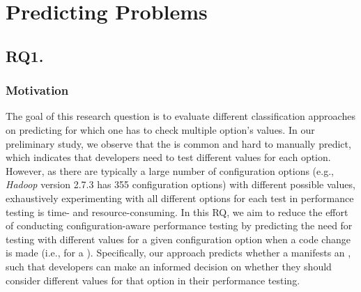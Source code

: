 
\section{Predicting \inconsistent Problems} \label{sec:rq-results}

\subsection*{\textbf{RQ1. \RQII}}
\label{sec:rq2}





\subsubsection*{Motivation}

The goal of this research question is to evaluate different classification approaches on predicting for which \instance one has to check multiple option's values. %
In our preliminary study, we observe that the \inconsistent is common and hard to manually predict, %
which indicates that developers need to test different values for each option. However, as there are typically a large number of configuration options (e.g., \emph{Hadoop} version 2.7.3 has 355 configuration options) with different possible values, exhaustively experimenting with all different options for each test in performance testing is time- and resource-consuming. In this RQ, we aim to reduce the effort of conducting configuration-aware performance testing by predicting the need for testing with different values for a given configuration option when a code change is made (i.e., for a \instance). Specifically, our approach predicts whether a \instance manifests an \inconsistent, such that developers can make an informed decision on whether they should consider different values for that option in their performance testing.

